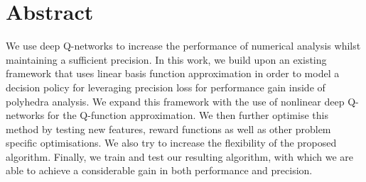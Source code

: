 
\chapter*{Abstract}
We use deep Q-networks to increase the performance of numerical analysis whilst maintaining a sufficient precision. In this work, we build upon an existing framework that uses linear basis function approximation in order to model a decision policy for leveraging precision loss for performance gain inside of polyhedra analysis. We expand this framework with the use of nonlinear deep Q-networks for the Q-function approximation. We then further optimise this method by testing new features, reward functions as well as other problem specific optimisations. We also try to increase the flexibility of the proposed algorithm. Finally, we train and test our resulting algorithm, with which we are able to achieve a considerable gain in both performance and precision.

